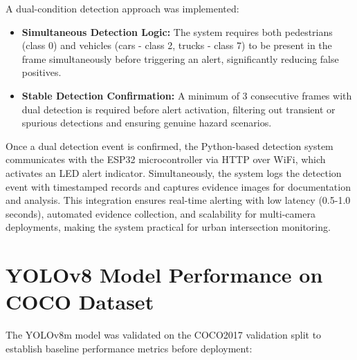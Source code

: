 \documentclass[a4paper, 12pt]{report}
\begin{document}
A dual-condition detection approach was implemented:

\begin{itemize}[itemsep=-4pt]
    \item \textbf{Simultaneous Detection Logic:} The system requires both pedestrians (class 0) and vehicles (cars - class 2, trucks - class 7) to be present in the frame simultaneously before triggering an alert, significantly reducing false positives.  
    \item \textbf{Stable Detection Confirmation:} A minimum of 3 consecutive frames with dual detection is required before alert activation, filtering out transient or spurious detections and ensuring genuine hazard scenarios.  
\end{itemize}
Once a dual detection event is confirmed, the Python-based detection system communicates with the ESP32 microcontroller via HTTP over WiFi, which activates an LED alert indicator. Simultaneously, the system logs the detection event with timestamped records and captures evidence images for documentation and analysis.
This integration ensures real-time alerting with low latency (0.5-1.0 seconds), automated evidence collection, and scalability for multi-camera deployments, making the system practical for urban intersection monitoring.

\section{YOLOv8 Model Performance on COCO Dataset}
The YOLOv8m model was validated on the COCO2017 validation split to establish baseline performance metrics before deployment:
\end{document}
